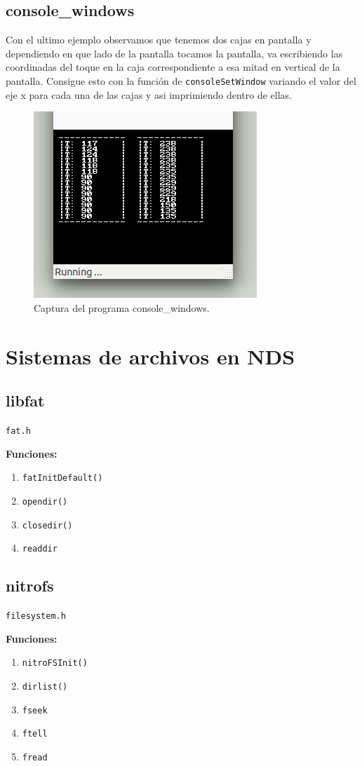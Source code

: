 \documentclass[12pt,english]{article}
\begin{document}
    
    \subsection{console\_windows}

    Con el ultimo ejemplo observamos que tenemos dos cajas en pantalla y dependiendo en que lado de la pantalla tocamos la pantalla, va escribiendo las coordinadas del toque en la caja correspondiente a esa mitad en vertical de la pantalla. Consigue esto con la función de \texttt{consoleSetWindow} variando el valor del eje x para cada una de las cajas y asi imprimiendo dentro de ellas.

    \begin{figure}[H] 
    \centering
    \includegraphics[scale=0.5]{images/console_windows}
    \caption{Captura del programa console\_windows.}
    \end{figure}

    \newpage

    \section{Sistemas de archivos en NDS}

    \subsection{libfat}

    \texttt{fat.h}

    \textbf{Funciones:}
    \begin{enumerate}
        \item \texttt{fatInitDefault()}
        \item \texttt{opendir()}
        \item \texttt{closedir()}
        \item \texttt{readdir}
    \end{enumerate}

    \subsection{nitrofs}
      
    \texttt{filesystem.h}

    \textbf{Funciones:}
    \begin{enumerate}
        \item \texttt{nitroFSInit()}
        \item \texttt{dirlist()}
        \item \texttt{fseek}
        \item \texttt{ftell}
        \item \texttt{fread}
    \end{enumerate}


    
    
\end{document}
